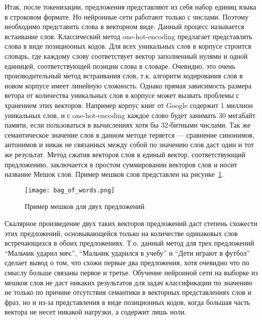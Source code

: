 Итак, после токенизации, предложения представляют из себя набор единиц языка в строковом формате. Но нейронные сети работают только с числами. Поэтому необходимо представить слова в векторном виде. Данный процесс называется встаивание слов. Классический метод one-hot-encoding предлагает представлять слова в виде позициооных кодов. Для всех уникальных слов в корпусе строится словарь, где каждому слову соответствует вектор заполненный нулями и одной единицей, соответствующей позиции слова в словаре. Очевидно, это очень производительный метод встраивания слов, т.к. алгоритм кодирования слов в новом корпусе имеет линейную сложность. Однако прямая зависимость размера ветора от количества уникальных слов в корпусе может вызвать проблемы с хранением этих векторов. Например корпус книг от Google содержит 1 миллион уникальных слов, и с one-hot-encoding каждое слово будет занимать 30 мегабайт памяти, если пользоваться в вычислениях хотя бы 32-битными числами. Так же семантическое значение слов в данном методе теряется --- сравнение синонимов, антонимов и никак не связанных между собой по значению слов даст один и тот же результат. Метод сжатия векторов слов в единый вектор, соответствующий предложению, заключается в простом суммировании векторов слов и носит название Мешок слов. Пример мешков слов представлен на рисунке~\ref{fig:overview:bag_of_words}.

\begin{figure}
\centering
  \texttt{[image: bag\_of\_words.png]}
  \caption{Пример мешков для двух предложений}\label{fig:overview:bag_of_words}
\end{figure}

Скалярное произведение двух таких векторов предложений даст степень схожести этих предложений, основывающейся только на количестве одинаковых слов встречающихся в обоих предложениях. Т.о. данный метод для трех предложений ``Мальчик ударил мяч.'', ``Мальчик ударился в учебу'' и ``Дети играют в футбол'' сделает вывод о том, что схожи первые два предложения, хотя очевидно что по смыслу больше связаны первое и третье. Обучение нейронной сети на выборке из мешков слов не даст никаких результатов для задач классификации по значению не только по причине отсутствия семантики в векторных представлениях слов и фраз, но и из-за представления в виде позиционных кодов, когда большая часть вектора не несет никакой нагрузки, а содержит лишь ноли.\cite{Goodfellow-et-al-2016}
